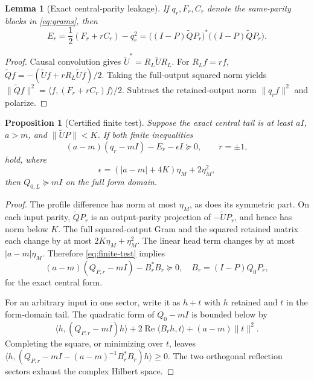 \documentclass[11pt]{article}
\numberwithin{equation}{section}
\newtheorem{proposition}[theorem]{Proposition}
\newtheorem{lemma}[theorem]{Lemma}
\theoremstyle{definition}
\theoremstyle{remark}
\newcommand{\Rea}{\operatorname{Re}}
\newcommand{\norm}[1]{\lVert#1\rVert}
\newcommand{\ip}[2]{\langle#1,#2\rangle}
\begin{document}
\begin{lemma}[Exact central-parity leakage]\label{lem:parity}
If $q_r,F_r,C_r$ denote the same-parity blocks in \eqref{eq:grams}, then
\begin{equation}\label{eq:leakage}
 E_r=\frac12(F_r+rC_r)-q_r^2
 =\bigl((I-P)\widetilde QP_r\bigr)^*
   \bigl((I-P)\widetilde QP_r\bigr).
\end{equation}
\end{lemma}
\begin{proof}
Causal convolution gives $\widetilde U^*=R_L\widetilde UR_L$.
For $R_Lf=rf$,
$\widetilde Qf=-(\widetilde Uf+rR_L\widetilde Uf)/2$.
Taking the full-output squared norm yields
$\norm{\widetilde Qf}^2=\ip f{(F_r+rC_r)f}/2$.
Subtract the retained-output norm $\norm{q_rf}^2$ and polarize.
\end{proof}

\begin{proposition}[Certified finite test]\label{prop:schur}
Suppose the exact central tail is at least $aI$, $a>m$, and
$\norm{\widetilde UP}<K$. If both finite inequalities
\begin{equation}\label{eq:finite-test}
 (a-m)(q_r-mI)-E_r-\epsilon I\succeq0,
 \qquad r=\pm1,
\end{equation}
hold, where
\begin{equation}\label{eq:eps}
 \epsilon=(|a-m|+4K)\eta_M+2\eta_M^2,
\end{equation}
then $Q_{0,L}\succeq mI$ on the full form domain.
\end{proposition}
\begin{proof}
The profile difference has norm at most $\eta_M$, as does its symmetric
part. On each input parity, $\widetilde QP_r$ is an output-parity projection
of $-\widetilde UP_r$, and hence has norm below $K$. The full squared-output
Gram and the squared retained matrix each change by at most
$2K\eta_M+\eta_M^2$. The linear head term changes by at most
$|a-m|\eta_M$. Therefore \eqref{eq:finite-test} implies
\[
 (a-m)(Q_{P,r}-mI)-B_r^*B_r\succeq0,
 \quad B_r=(I-P)Q_0P_r,
\]
for the exact central form.

For an arbitrary input in one sector, write it as $h+t$ with $h$ retained
and $t$ in the form-domain tail. The quadratic form of $Q_0-mI$ is bounded
below by
\[
 \ip h{(Q_{P,r}-mI)h}
 +2\Rea\ip{B_rh}t+(a-m)\norm t^2.
\]
Completing the square, or minimizing over $t$, leaves
$\ip h{(Q_{P,r}-mI-(a-m)^{-1}B_r^*B_r)h}\ge0$.
The two orthogonal reflection sectors exhaust the complex Hilbert space.
\end{proof}
\end{document}
